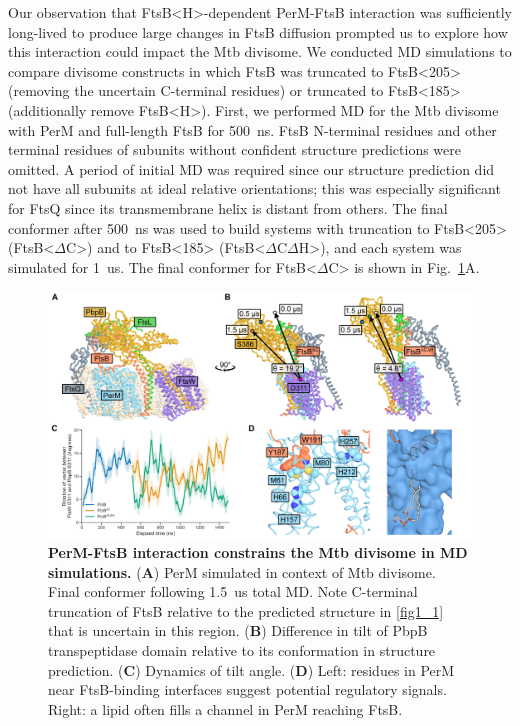 \documentclass[twocolumn,pdflatex,sn-nature]{sn-jnl}%
\def\textsuperscript#1{<#1>}%
\newcommand\mtb{Mtb}
\newcommand\ftsbH{FtsB\textsuperscript{H}}
\newcommand\ftsbdCdH{FtsB\textsuperscript{$\Delta{}$C$\Delta{}$H}}
\newcommand\ftsbdC{FtsB\textsuperscript{$\Delta{}$C}}
\begin{document}
Our observation that \ftsbH{}-dependent PerM-FtsB interaction was sufficiently long-lived to produce large changes in FtsB diffusion prompted us to explore how this interaction could impact the \mtb{} divisome.
We conducted MD simulations to compare divisome constructs in which FtsB was truncated to FtsB\textsuperscript{205} (removing the uncertain C-terminal residues) or truncated to FtsB\textsuperscript{185} (additionally remove \ftsbH{}).
First, we performed MD for the \mtb{} divisome with PerM and full-length FtsB for \qty{500}{\ns}. FtsB N-terminal residues and other terminal residues of subunits without confident structure predictions were omitted.
A period of initial MD was required since our structure prediction did not have all subunits at ideal relative orientations; this was especially significant for FtsQ since its transmembrane helix is distant from others.
The final conformer after \qty{500}{\ns} was used to build systems with truncation to FtsB\textsuperscript{205} (\ftsbdC{}) and to FtsB\textsuperscript{185} (\ftsbdCdH{}), and each system was simulated for \qty{1}{us}.
The final conformer for \ftsbdC{} is shown in Fig.~\ref{fig5}A.

\begin{figure}[htb]
    \centering
    \includegraphics[width=1.0\textwidth]{../figures/fig5.png}
    \caption{
        \textbf{PerM-FtsB interaction constrains the \mtb{} divisome in MD simulations.}
        (\textbf{A}) PerM simulated in context of \mtb{} divisome. Final conformer following \qty{1.5}{us} total MD. Note C-terminal truncation of FtsB relative to the predicted structure in \ref{fig1_1} that is uncertain in this region.
        (\textbf{B}) Difference in tilt of PbpB transpeptidase domain relative to its conformation in structure prediction.
        (\textbf{C}) Dynamics of tilt angle. (\textbf{D}) Left: residues in PerM near FtsB-binding interfaces suggest potential regulatory signals. Right: a lipid often fills a channel in PerM reaching FtsB.
    }\label{fig5}
\end{figure}
\end{document}
